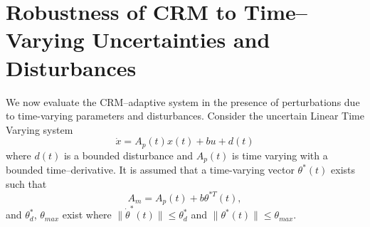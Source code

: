 \documentclass[10pt,journal]{IEEEtran}
\theoremstyle{plain}%
\theoremstyle{definition}
\newcommand{\be}[0]{\begin{equation}}
\newcommand{\ee}[0]{\end{equation}}
\newcommand{\ben}[0]{\begin{equation*}}
\newcommand{\een}[0]{\end{equation*}}
\newcommand{\norms}[1]{\lVert#1\rVert}
\newcommand{\normB}[0]{\norms}
\let\norm=\normB
\begin{document}






\section{Robustness of CRM to Time--Varying Uncertainties and Disturbances}
We now evaluate the CRM--adaptive system in the presence of perturbations due to time-varying parameters and disturbances. Consider the uncertain Linear Time Varying system
\be\label{s2:sys}
\dot x = A_p(t) x(t) + b u  + d(t)
\ee
where $d(t)$ is a bounded disturbance and $A_p(t)$ is time varying with a bounded time--derivative. It is assumed that a time-varying vector $\theta^*(t)$ exists such that 
\be
A_m = A_p (t)+ b \theta^{*T}(t),
\ee
and $\theta_d^*$, $\theta_{max}$ exist where $\norm{\dot \theta^*(t)}\leq{\theta_d^*}$ and $\norm{\theta^*(t)}\leq \theta_{max}.$
\end{document}
